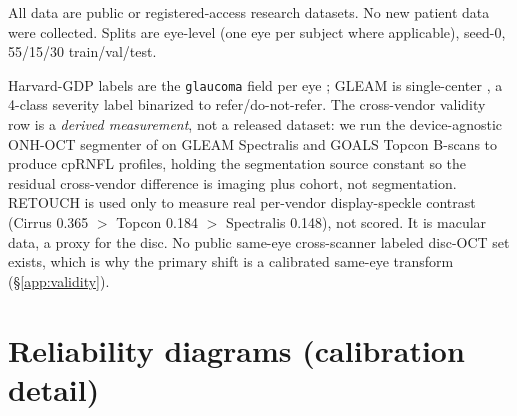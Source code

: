 All data are public or registered-access research datasets. No new patient data were collected. Splits are
eye-level (one eye per subject where applicable), seed-0, 55/15/30 train/val/test.

\begin{table}[t]
  \centering
  \caption{\textbf{Datasets.} Two are scored (thickness-map and B-scan axes). Two supply the real-data validation
  (cross-vendor anatomy; per-vendor speckle calibration).}
  \label{tab:datasets}
  \small
  \setlength{\tabcolsep}{4pt}
\end{table}

Harvard-GDP labels are the \texttt{glaucoma} field per eye \citep{luo2023harvardgdp}; GLEAM is single-center
\citep{gleam2026}, a 4-class severity label binarized to refer/do-not-refer. The cross-vendor validity row is a
\emph{derived measurement}, not a released dataset: we run the device-agnostic ONH-OCT segmenter of
\citet{driessen2024} on GLEAM Spectralis and GOALS Topcon \citep{goals2022} B-scans to produce cpRNFL
profiles, holding the segmentation source constant so the residual cross-vendor difference is imaging plus cohort,
not segmentation. RETOUCH \citep{bogunovic2019retouch} is used only to measure real per-vendor display-speckle
contrast (Cirrus 0.365 $>$ Topcon 0.184 $>$ Spectralis 0.148), not scored. It is macular data, a proxy for the disc. No
public same-eye cross-scanner labeled disc-OCT set exists, which is why the primary shift is a calibrated same-eye
transform (\S\ref{app:validity}).

\section{Reliability diagrams (calibration detail)}
\label{app:reliability}

